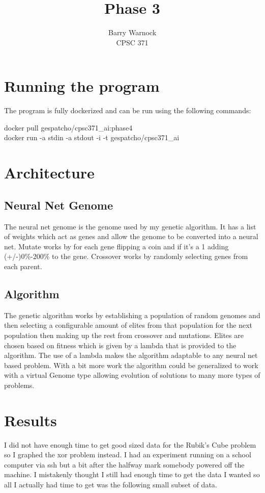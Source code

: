 \documentclass{article}
\title{Phase 3}
\author{Barry Warnock \\
  CPSC 371}
\begin{document}
\maketitle{}
\section{Running the program}
The program is fully dockerized and can be run using the following commands:
\begin{center}
  docker pull gespatcho/cpsc371\_ai:phase4\\
  docker run -a stdin -a stdout -i -t gespatcho/cpsc371\_ai
\end{center}

\section{Architecture}
\subsection{Neural Net Genome}
The neural net genome is the genome used by my genetic algorithm. It has a list of weights which act as
genes and allow the genome to be converted into a neural net. Mutate works by for each gene flipping a coin
and if it's a 1 adding (+/-)0\%-200\% to the gene. Crossover works by randomly selecting genes from each
parent.

\subsection{Algorithm}
The genetic algorithm works by establishing a population of random genomes and then selecting a configurable
amount of elites from that population for the next population then making up the rest from crossover and
mutations. Elites are chosen based on fitness which is given by a lambda that is provided to the algorithm.
The use of a lambda makes the algorithm adaptable to any neural net based problem. With a bit more work
the algorithm could be generalized to work with a virtual Genome type allowing evolution of solutions to
many more types of problems. 
\newpage

\section{Results}
I did not have enough time to get good sized data for the Rubik's Cube problem so I graphed the xor problem instead. I had an experiment running on
a school computer via ssh but a bit after the halfway mark somebody powered off the machine. I mistakenly thought I still had enough time to get
the data I wanted so all I actually had time to get was the following small subset of data.
\end{document}
